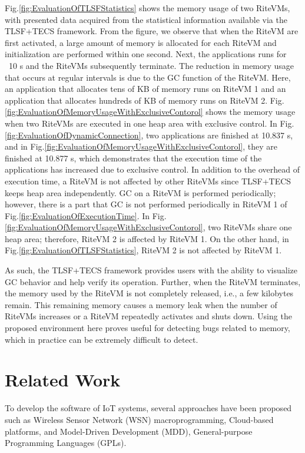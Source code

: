 \documentclass[JIP]{ipsj_v2/UTF8/ipsj}
\begin{document}
Fig.\ref{fig:EvaluationOfTLSFStatistics} shows the memory usage of two RiteVMs, with presented data acquired from the statistical information available via the TLSF+TECS framework.
From the figure, we observe that when the RiteVM are first activated, a large amount of memory is allocated for each RiteVM and initialization are performed within one second.
Next, the applications runs for ~10 s and the RiteVMs subsequently terminate.
The reduction in memory usage that occurs at regular intervals is due to the GC function of the RiteVM.
Here, an application that allocates tens of KB of memory runs on RiteVM 1 and an application that allocates hundreds of KB of memory runs on RiteVM 2.
Fig.\ref{fig:EvaluationOfMemoryUsageWithExclusiveContorol} shows the memory usage when two RiteVMs are executed in one heap area with exclusive control.
In Fig.\ref{fig:EvaluationOfDynamicConnection}, two applications are finished at 10.837 s, and in Fig.\ref{fig:EvaluationOfMemoryUsageWithExclusiveContorol}, they are finished at 10.877 s, which demonstrates that the execution time of the applications has increased due to exclusive control.
In addition to the overhead of execution time, a RiteVM is not affected by other RiteVMs since TLSF+TECS keeps heap area independently.
GC on a RiteVM is performed periodically; however, there is a part that GC is not performed periodically in RiteVM 1 of Fig.\ref{fig:EvaluationOfExecutionTime}.
In Fig.\ref{fig:EvaluationOfMemoryUsageWithExclusiveContorol}, two RiteVMs share one heap area; therefore, RiteVM 2 is affected by RiteVM 1.
On the other hand, in Fig.\ref{fig:EvaluationOfTLSFStatistics}, RiteVM 2 is not affected by RiteVM 1.

As such, the TLSF+TECS framework provides users with the ability to visualize GC behavior and help verify its operation.
Further, when the RiteVM terminates, the memory used by the RiteVM is not completely released, i.e., a few kilobytes remain.
This remaining memory causes a memory leak when the number of RiteVMs increases or a RiteVM repeatedly activates and shuts down.
Using the proposed environment here proves useful for detecting bugs related to memory, which in practice can be extremely difficult to detect.



\section{Related Work}
\label{sec:Related Work}

To develop the software of IoT systems, several approaches have been proposed \cite{par:frameworkCPS} such as Wireless Sensor Network (WSN) macroprogramming, Cloud-based platforms, and Model-Driven Development (MDD), General-purpose Programming Languages (GPLs).
\end{document}
